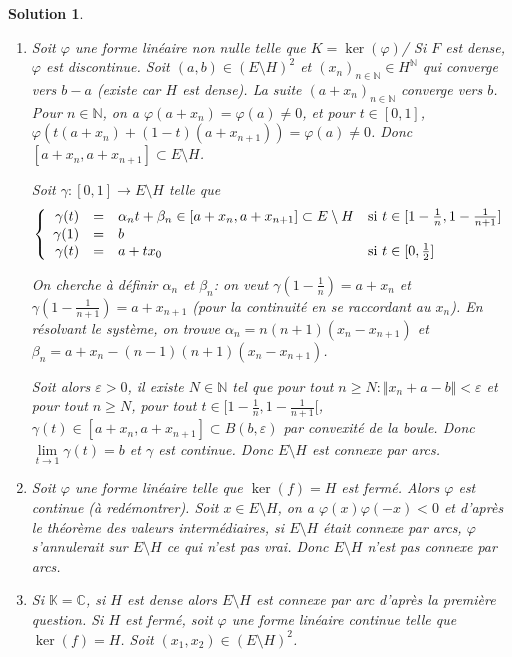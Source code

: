 \documentclass[12pt]{article}
\newtheorem{solution}{Solution}[section]
\theoremstyle{remark}
\newcommand{\K}{\mathbb{K}} \newcommand{\R}{\mathbb{R}}
\newcommand{\C}{\mathbb{C}} \newcommand{\Q}{\mathbb{Q}}
\newcommand{\N}{\mathbb{N}} \newcommand{\Z}{\mathbb{Z}}
\begin{document}
\begin{solution}
	\phantom{}
	\begin{enumerate}
		\item Soit $\varphi$ une forme linéaire non nulle telle que $K=\ker(\varphi)$/ Si $F$ est dense, $\varphi$ est discontinue. Soit $(a,b)\in(E\setminus H)^{2}$ et $(x_{n})_{n\in\N}\in H^{\N}$ qui converge vers $b-a$ (existe car $H$ est dense). La suite $(a+x_{n})_{n\in\N}$ converge vers $b$. Pour $n\in\N$, on a $\varphi(a+x_{n})=\varphi(a)\neq0$, et pour $t\in[0,1]$, $\varphi(t(a+x_{n})+(1-t)(a+x_{n+1}))=\varphi(a)\neq0$. Donc $[a+x_{n},a+x_{n+1}]\subset E\setminus H$.
		
		Soit $\gamma:[0,1]\to E\setminus H$ telle que 
		$$
		\left\{
			\begin{array}[]{rcll}
				\gamma(t) & = &\alpha_{n}t+\beta_{n}\in[a+x_{n},a+x_{n+1}]\subset E\setminus H &\text{si }t\in[1-\frac{1}{n},1-\frac{1}{n+1}]\\
				\gamma(1) & = &b&\\
				\gamma(t) &= & a+tx_{0}&\text{si }t\in[0,\frac{1}{2}]
			\end{array}
		\right.
		$$

		On cherche à définir $\alpha_{n}$ et $\beta_{n}$: on veut $\gamma(1-\frac{1}{n})=a+x_{n}$ et $\gamma(1-\frac{1}{n+1})=a+x_{n+1}$ (pour la continuité en se raccordant au $x_{n}$). En résolvant le système, on trouve $\alpha_{n}=n(n+1)(x_{n}-x_{n+1})$ et $\beta_{n}=a+x_{n}-(n-1)(n+1)(x_{n}-x_{n+1})$.

		Soit alors $\varepsilon>0$, il existe $N\in\N$ tel que pour tout $n\geqslant N\colon\Vert x_{n}+a-b\Vert<\varepsilon$ et pour tout $n\geqslant N$, pour tout $t\in[1-\frac{1}{n},1-\frac{1}{n+1}[$, $\gamma(t)\in[a+x_{n},a+x_{n+1}]\subset B(b,\varepsilon)$ par convexité de la boule. Donc $\lim\limits_{t\to 1}\gamma(t)=b$ et $\gamma$ est continue. Donc $E\setminus H$ est connexe par arcs.

		\item Soit $\varphi$ une forme linéaire telle que $\ker(f)=H$ est fermé. Alors $\varphi$ est continue (à redémontrer). Soit $x\in E\setminus H$, on a $\varphi(x)\varphi(-x)<0$ et d'après le théorème des valeurs intermédiaires, si $E\setminus H$ était connexe par arcs, $\varphi$ s'annulerait sur $E\setminus H$ ce qui n'est pas vrai. Donc $E\setminus H$ n'est pas connexe par arcs.
		
		\item Si $\K=\C$, si $H$ est dense alors $E\setminus H$ est connexe par arc d'après la première question. Si $H$ est fermé, soit $\varphi$ une forme linéaire continue telle que $\ker(f)=H$. Soit $(x_{1},x_{2})\in(E\setminus H)^{2}$. 
		

\end{enumerate}
\end{solution}
\end{document}
